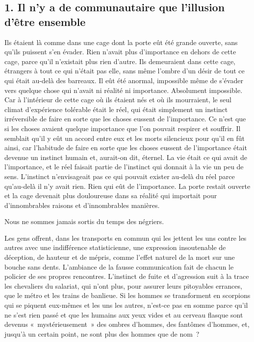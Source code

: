 \documentclass[french,twoside]{book} %
\begin{document}
\subsection[{1. Il n’y a de communautaire que l’illusion d’être ensemble}]{\textsc{1.} Il n’y a de communautaire que l’illusion d’être ensemble}
\noindent Ils étaient là comme dans une cage dont la porte eût été grande ouverte, sans qu’ils puissent s’en évader. Rien n’avait plus d’importance en dehors de cette cage, parce qu’il n’existait plus rien d’autre. Ils demeuraient dans cette cage, étrangers à tout ce qui n’était pas elle, sans même l’ombre d’un désir de tout ce qui était au-delà des barreaux. Il eût été anormal, impossible même de s’évader vers quelque chose qui n’avait ni réalité ni importance. Absolument impossible. Car à l’intérieur de cette cage où ils étaient nés et où ils mourraient, le seul climat d’expérience tolérable était le réel, qui était simplement un instinct irréversible de faire en sorte que les choses eussent de l’importance. Ce n’est que si les choses avaient quelque importance que l’on pouvait respirer et souffrir. Il semblait qu’il y eût un accord entre eux et les morts silencieux pour qu’il en fût ainsi, car l’habitude de faire en sorte que les choses eussent de l’importance était devenue un instinct humain et, aurait-on dit, éternel. La vie était ce qui avait de l’importance, et le réel faisait partie de l’instinct qui donnait à la vie un peu de sens. L’instinct n’envisageait pas ce qui pouvait exister au-delà du réel parce qu’au-delà il n’y avait rien. Rien qui eût de l’importance. La porte restait ouverte et la cage devenait plus douloureuse dans sa réalité qui importait pour d’innombrables raisons et d’innombrables manières.\par
Nous ne sommes jamais sortis du temps des négriers.\par
Les gens offrent, dans les transports en commun qui les jettent les uns contre les autres avec une indifférence statisticienne, une expression insoutenable de déception, de hauteur et de mépris, comme l’effet naturel de la mort sur une bouche sans dents. L’ambiance de la fausse communication fait de chacun le policier de ses propres rencontres. L’instinct de fuite et d’agression suit à la trace les chevaliers du salariat, qui n’ont plus, pour assurer leurs pitoyables errances, que le métro et les trains de banlieue. Si les hommes se transforment en scorpions qui se piquent eux-mêmes et les uns les autres, n’est-ce pas en somme parce qu’il ne s’est rien passé et que les humains aux yeux vides et au cerveau flasque sont devenus « mystérieusement » des ombres d’hommes, des fantômes d’hommes, et, jusqu’à un certain point, ne sont plus des hommes que de nom ?\par
\end{document}
